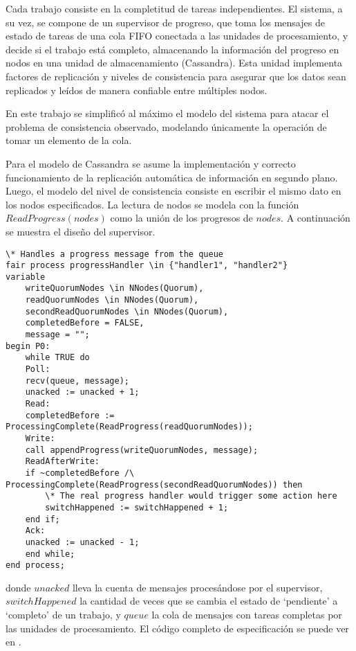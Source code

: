 \documentclass[runningheads]{llncs}
\begin{document}
Cada trabajo consiste en la completitud de tareas independientes. El sistema, a su vez, se compone de un supervisor de progreso, que toma los mensajes de estado de tareas de una cola FIFO conectada a las unidades de procesamiento, y decide si el trabajo está completo, almacenando la información del progreso en nodos en una unidad de almacenamiento (Cassandra). Esta unidad implementa factores de replicación y niveles de consistencia para asegurar que los datos sean replicados y leídos de manera confiable entre múltiples nodos.

En este trabajo se simplificó al máximo el modelo del sistema para atacar el problema de consistencia observado, modelando únicamente la operación de tomar un elemento de la cola.

Para el modelo de Cassandra se asume la implementación y correcto funcionamiento de la replicación automática de información en segundo plano. Luego, el modelo del nivel de consistencia consiste en escribir el mismo dato en los nodos especificados. La lectura de nodos se modela con la función $ReadProgress(nodes)$ como la unión de los progresos de $nodes$. A continuación se muestra el diseño del supervisor.

\begin{lstlisting}
\* Handles a progress message from the queue
fair process progressHandler \in {"handler1", "handler2"}
variable
    writeQuorumNodes \in NNodes(Quorum),
    readQuorumNodes \in NNodes(Quorum),
    secondReadQuorumNodes \in NNodes(Quorum),
    completedBefore = FALSE,
    message = "";
begin P0:
    while TRUE do
    Poll:
    recv(queue, message);
    unacked := unacked + 1;
    Read:
    completedBefore := ProcessingComplete(ReadProgress(readQuorumNodes));
    Write:
    call appendProgress(writeQuorumNodes, message);
    ReadAfterWrite:
    if ~completedBefore /\ ProcessingComplete(ReadProgress(secondReadQuorumNodes)) then
        \* The real progress handler would trigger some action here
        switchHappened := switchHappened + 1;
    end if;
    Ack:
    unacked := unacked - 1;
    end while;
end process;    
\end{lstlisting}
donde $unacked$ lleva la cuenta de mensajes procesándose por el supervisor, $switchHappened$ la cantidad de veces que se cambia el estado de ‘pendiente’ a ‘completo’ de un trabajo, y $queue$ la cola de mensajes con tareas completas por las unidades de procesamiento. El código completo de especificación se puede ver en 
\cite{caso_de_estudio}.
\end{document}
